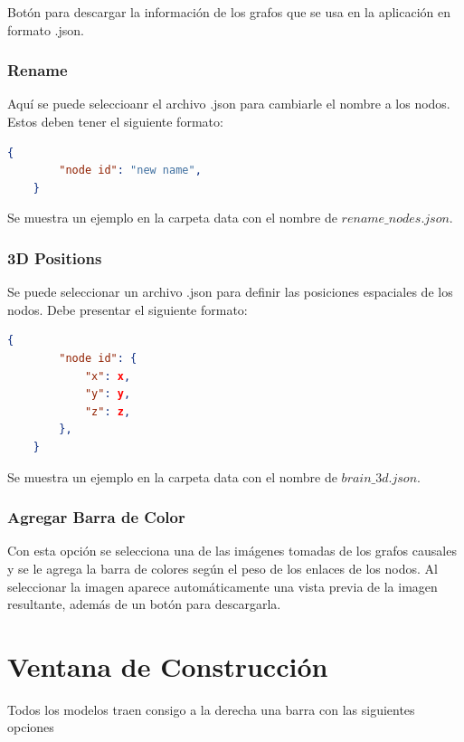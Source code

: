 \documentclass[spanish]{article}
\begin{document}
Botón para descargar la información de los grafos que se usa en la aplicación en formato .json.


\subsubsection*{Rename}

Aquí se puede seleccioanr el archivo .json para cambiarle el nombre a los nodos. Estos deben tener el siguiente formato:\\

\begin{lstlisting}[language=json,firstnumber=1]
    {
        "node id": "new name",
    }
\end{lstlisting}

Se muestra un ejemplo en la carpeta data con el nombre de $rename\_nodes.json$.


\subsubsection*{3D Positions}

Se puede seleccionar un archivo .json para definir las posiciones espaciales de los nodos. Debe presentar el siguiente formato:

\begin{lstlisting}[language=json,firstnumber=1]
    {
        "node id": {
            "x": x,
            "y": y,
            "z": z,
        },
    }
\end{lstlisting}

Se muestra un ejemplo en la carpeta data con el nombre de $brain\_3d.json$.\\


\subsubsection*{Agregar Barra de Color}

Con esta opción se selecciona una de las imágenes tomadas de los grafos causales y se le agrega la barra de colores según el peso de los enlaces de los nodos. Al seleccionar la imagen aparece automáticamente una vista previa de la imagen resultante, además de un botón para descargarla.


\section*{Ventana de Construcción}

Todos los modelos traen consigo a la derecha una barra con las siguientes opciones
\end{document}

